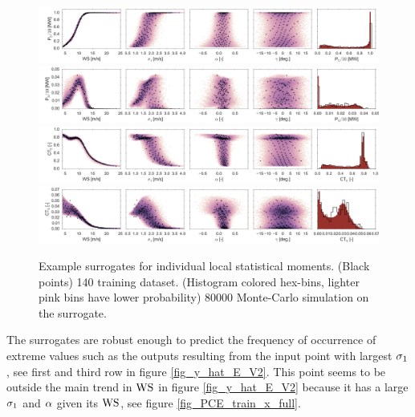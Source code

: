 \documentclass[preprint,12pt]{elsarticle}
\begin{document}
\begin{figure}[h!]
\begin{centering}
\includegraphics[width=0.94\columnwidth]{Figures/Surrgotes_20-fold/P_E_MC_PCE_last_row.jpg} \\
\includegraphics[width=0.94\columnwidth]{Figures/Surrgotes_20-fold/P_S_MC_PCE_last_row.jpg} \\
\includegraphics[width=0.94\columnwidth]{Figures/Surrgotes_20-fold/CT_E_MC_PCE_last_row.jpg} \\
\includegraphics[width=0.94\columnwidth]{Figures/Surrgotes_20-fold/CT_S_MC_PCE_last_row.jpg}
\caption{Example surrogates for individual local statistical moments. (Black points) 140 training dataset. (Histogram colored hex-bins, lighter pink bins have lower probability) 80000 Monte-Carlo simulation on the surrogate.}
\label{fig_y_hat_E_V}
\end{centering}
\end{figure}

The surrogates are robust enough to predict the frequency of occurrence of extreme values such as the outputs resulting from the input point with largest $\sigma_{1}$, see first and third row in figure \ref{fig_y_hat_E_V2}. This point seems to be outside the main trend in $\text{WS}$ in figure \ref{fig_y_hat_E_V2} because it has a large $\sigma_{1}$ and $\alpha$ given its $\text{WS}$, see figure \ref{fig_PCE_train_x_full}.
\end{document}
